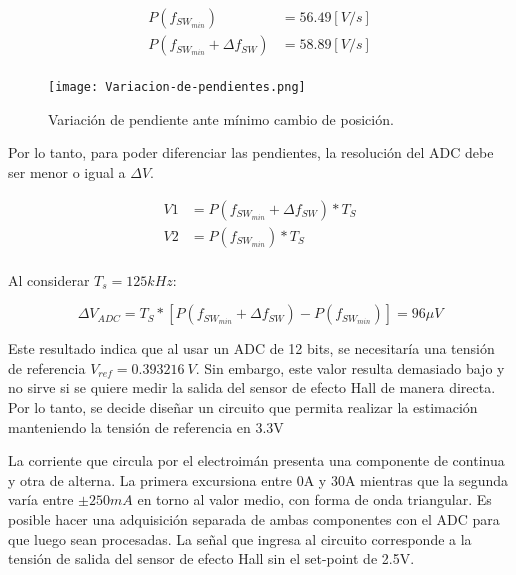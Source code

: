 \begin{equation} 
	\begin{aligned}
		P(f_{SW_{min}}) &= 56.49 [V/s] \\
		P(f_{SW_{min}} + \Delta f_{SW}) &= 58.89 [V/s] \\
	\end{aligned}
\end{equation}


\begin{figure}[H]
	\centering
	\texttt{[image: Variacion-de-pendientes.png]}
	\caption{Variación de pendiente ante mínimo cambio de posición.}
	\label{fig:variacion-de-pendiente}
\end{figure}

\noindent Por lo tanto, para poder diferenciar las pendientes, la resolución del ADC debe ser menor o igual a $\Delta V$.

\begin{equation} 
	\begin{aligned}
		V1 &= P(f_{SW_{min}} + \Delta f_{SW})* T_S \\
		V2 &= P(f_{SW_{min}})* T_S \\		 
	\end{aligned}
\end{equation}

\noindent Al considerar $T_s = 125 kHz$:

\begin{equation} 
	\Delta V_{ADC} = T_S * [P(f_{SW_{min}} + \Delta f_{SW}) - P(f_{SW_{min}})] = 96 \mu V
\end{equation}



\noindent Este resultado indica que al usar un ADC de 12 bits, se necesitaría una tensión de referencia $V_{ref} = 0.393216\:V$. Sin embargo, este valor resulta demasiado bajo y no sirve si se quiere medir la salida del sensor de efecto Hall de manera directa. Por lo tanto, se decide diseñar un circuito que permita realizar la estimación manteniendo la tensión de referencia en 3.3V

\noindent La corriente que circula por el electroimán presenta una componente de continua y otra de alterna. La primera excursiona entre 0A y 30A mientras que la segunda varía entre $\pm 250 mA$ en torno al valor medio, con forma de onda triangular. Es posible hacer una adquisición separada de ambas componentes con el ADC para que luego sean procesadas. La señal que ingresa al circuito corresponde a la tensión de salida del sensor de efecto Hall sin el set-point de 2.5V.

